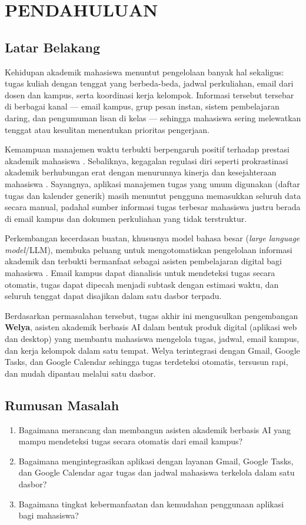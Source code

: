 \chapter{PENDAHULUAN}

\section{Latar Belakang}
Kehidupan akademik mahasiswa menuntut pengelolaan banyak hal sekaligus:
tugas kuliah dengan tenggat yang berbeda-beda, jadwal perkuliahan, email
dari dosen dan kampus, serta koordinasi kerja kelompok. Informasi tersebut
tersebar di berbagai kanal --- email kampus, grup pesan instan, sistem
pembelajaran daring, dan pengumuman lisan di kelas --- sehingga mahasiswa
sering melewatkan tenggat atau kesulitan menentukan prioritas pengerjaan.

Kemampuan manajemen waktu terbukti berpengaruh positif terhadap prestasi
akademik mahasiswa \parencite{kamilatunnisa2025}. Sebaliknya, kegagalan
regulasi diri seperti prokrastinasi akademik berhubungan erat dengan
menurunnya kinerja dan kesejahteraan mahasiswa \parencite{fadila2024}.
Sayangnya, aplikasi manajemen
tugas yang umum digunakan (daftar tugas dan kalender generik) masih
menuntut pengguna memasukkan seluruh data secara manual, padahal sumber
informasi tugas terbesar mahasiswa justru berada di email kampus dan
dokumen perkuliahan yang tidak terstruktur.

Perkembangan kecerdasan buatan, khususnya model bahasa besar
(\emph{large language model}/LLM), membuka peluang untuk mengotomatiskan
pengelolaan informasi akademik dan terbukti bermanfaat sebagai asisten
pembelajaran digital bagi mahasiswa
\parencite{johan2026, hidayah2025}. Email kampus dapat dianalisis untuk mendeteksi tugas
secara otomatis, tugas dapat dipecah menjadi subtask dengan estimasi waktu,
dan seluruh tenggat dapat disajikan dalam satu dasbor terpadu.

Berdasarkan permasalahan tersebut, tugas akhir ini mengusulkan pengembangan
\textbf{Welya}, asisten akademik berbasis AI dalam bentuk produk digital
(aplikasi web dan desktop) yang membantu mahasiswa mengelola tugas, jadwal, email
kampus, dan kerja kelompok dalam satu tempat. Welya terintegrasi dengan
Gmail, Google Tasks, dan Google Calendar sehingga tugas terdeteksi
otomatis, tersusun rapi, dan mudah dipantau melalui satu dasbor.

\section{Rumusan Masalah}
\begin{enumerate}
  \item Bagaimana merancang dan membangun asisten akademik berbasis AI
    yang mampu mendeteksi tugas secara otomatis dari email kampus?
  \item Bagaimana mengintegrasikan aplikasi dengan layanan Gmail, Google
    Tasks, dan Google Calendar agar tugas dan jadwal mahasiswa
    terkelola dalam satu dasbor?
  \item Bagaimana tingkat kebermanfaatan dan kemudahan penggunaan
    aplikasi bagi mahasiswa?
\end{enumerate}

